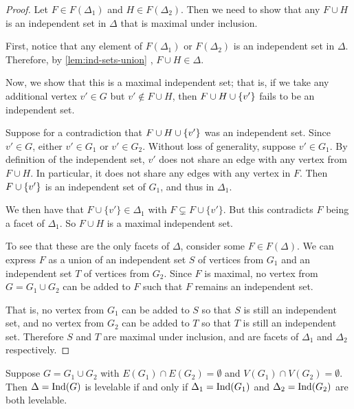 \begin{proof}
Let $F \in F(\Delta_1)$ and $H \in F(\Delta_2)$. Then we need to show that any $F \cup H$ is an independent set in $\Delta$ that is maximal under inclusion.

First, notice that any element of $F(\Delta_1)$ or $F(\Delta_2)$ is an independent set in $\Delta$.
Therefore, by \autoref{lem:ind-sets-union} , $F \cup H \in \Delta$.

Now, we show that this is a maximal independent set; that is, if we take any additional vertex $v' \in G$ but $v' \not \in F \cup H$, then $F \cup H \cup \{ v' \}$ fails to be an independent set.

Suppose for a contradiction that $F \cup H \cup \{ v' \}$ was an independent set. Since $v' \in G$, either $v' \in G_1$ or $v' \in G_2$.  Without loss of generality, suppose $v' \in G_1$. By definition of the independent set, $v'$ does not share an edge with any vertex from $F \cup H$. In particular, it does not share any edges with any vertex in $F$. Then $F \cup \{ v' \}$ is an independent set of $G_1$, and thus in $\Delta_1$.

We then have that $F \cup \{v'\} \in \Delta_1$ with $F \subsetneq F \cup \{v'\}$. But this contradicts $F$ being a facet of $\Delta_1$. So $F \cup H$ is a maximal independent set.

To see that these are the only facets of $\Delta$, consider some $F \in F(\Delta)$. We can express $F$ as a union of an independent set $S$ of vertices from $G_1$ and an independent set $T$ of vertices from $G_2$. Since $F$ is maximal, no vertex from $G = G_1 \cup G_2$ can be added to $F$ such that $F$ remains an independent set. 

That is, no vertex from $G_1$ can be added to $S$ so that $S$ is still an independent set, and no vertex from $G_2$ can be added to $T$ so that $T$ is still an independent set. Therefore $S$ and $T$ are maximal under inclusion, and are facets of $\Delta_1$ and $\Delta_2$ respectively.
\end{proof}

\begin{theorem} \label{thm:disconnected-1}
Suppose $G = G_1 \cup G_2$ with $E(G_1) \cap E(G_2) = \emptyset$ and $V(G_1) \cap V(G_2) = \emptyset$. Then $\Delta = \textrm{Ind}(G)$ is levelable if and only if $\Delta_1 = \textrm{Ind}(G_1)$ and $\Delta_2 = \textrm{Ind}(G_2)$ are both levelable.
\end{theorem}


